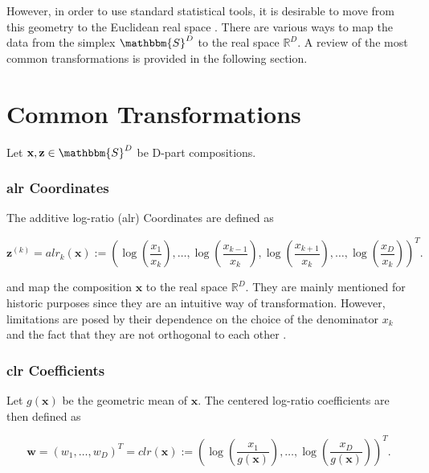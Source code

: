 However, in order to use standard statistical tools, it is desirable to move from this geometry to the Euclidean real space \cite{Filzmoser:2020}. There are various ways to map the data from the simplex $\mathbbm{S}^D$ to the real space $\mathbb{R}^D$. A review of the most common transformations is provided in the following section.

\section{Common Transformations}
\label{sec: Common Transformations}

Let $\textbf{x}, \textbf{z} \in \mathbbm{S}^D$ be D-part compositions.
\subsubsection{alr Coordinates}
\label{sec:alr Coordinates}

The additive log-ratio (alr) Coordinates are defined as \cite{Kynclova:2015}

\begin{equation}
\textbf{z}^{(k)} = alr_k(\textbf{x}) := \left(\log\left(\frac{x_1}{x_k}\right), \ldots, \log\left(\frac{x_{k-1}}{x_k}\right),\log\left(\frac{x_{k+1}}{x_k}\right),\ldots,\log\left(\frac{x_D}{x_k}\right)\right)^T.
\label{eq:alr Coordinates}
\end{equation}

and map the composition $\textbf{x}$ to the real space $\mathbb{R}^D$. They are mainly mentioned for historic purposes since they are an intuitive way of transformation. However, limitations are posed by their dependence on the choice of the denominator $x_k$ and the fact that they are not orthogonal to each other \cite{Filzmoser:2020}. 

\subsubsection{clr Coefficients}
\label{sec:clr Coefficients}

Let $g(\textbf{x})$ be the geometric mean of $\textbf{x}$. The centered log-ratio coefficients are then defined as \cite{Kynclova:2015}

\begin{equation}
\textbf{w} = (w_1,\ldots, w_D)^T = clr(\textbf{x}) := \left(\log\left(\frac{x_1}{g(\textbf{x})}\right),\ldots, \log\left(\frac{x_D}{g(\textbf{x})}\right)\right)^T.
\label{eq:clr Coefficients}
\end{equation}

